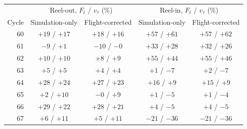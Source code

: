 \begin{tabular}{rcccc}
\toprule
& \multicolumn{2}{c}{Reel-out, $F_t$ / $v_\tau$ (\%)} & \multicolumn{2}{c}{Reel-in, $F_t$ / $v_\tau$ (\%)} \\
Cycle & Simulation-only & Flight-corrected & Simulation-only & Flight-corrected \\
\midrule
60 & $+19$ / $+17$ & $+18$ / $+16$ & $+57$ / $+61$ & $+57$ / $+62$ \\
61 & $-9$ / $+1$ & $-10$ / $-0$ & $+33$ / $+28$ & $+32$ / $+26$ \\
62 & $+10$ / $+10$ & $+8$ / $+9$ & $+55$ / $+44$ & $+55$ / $+46$ \\
63 & $+5$ / $+5$ & $+4$ / $+4$ & $+1$ / $-7$ & $+2$ / $-7$ \\
64 & $+28$ / $+24$ & $+27$ / $+23$ & $+16$ / $+9$ & $+15$ / $+9$ \\
65 & $+2$ / $+10$ & $-0$ / $+9$ & $+1$ / $-5$ & $+1$ / $-4$ \\
66 & $+29$ / $+22$ & $+28$ / $+21$ & $+4$ / $-5$ & $+4$ / $-5$ \\
67 & $+6$ / $+11$ & $+5$ / $+11$ & $-21$ / $-36$ & $-21$ / $-36$ \\
\bottomrule
\end{tabular}
